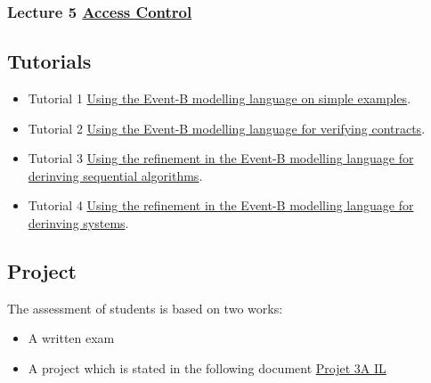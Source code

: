 \documentclass[ 12pt]{article}
\begin{document}
\subsubsection{ Lecture 5 
    \href{http://mery54.github.io/teaching/mosos/lecturesnotes/mcfsi-lect3.pdf}{Access 
      Control }
}



\subsection{Tutorials}

  \begin{itemize}
  \item[]   Tutorial 1
    \href{http://mery54.github.io/teaching/mosos/lecturesnotes/mcfsi-td1.pdf}{Using
      the Event-B modelling language on simple examples}.

   \item[]   Tutorial 2
    \href{http://mery54.github.io/teaching/mosos/lecturesnotes/mcfsi-td2.pdf}{Using
      the Event-B modelling language  for verifying contracts}.



    \item[]   Tutorial 3
    \href{http://mery54.github.io/teaching/mosos/lecturesnotes/mcfsi-td3.pdf}{Using
      the refinement in 
      the Event-B modelling language  for derinving sequential algorithms}.


    
    \item[]   Tutorial 4
    \href{http://mery54.github.io/teaching/mosos/lecturesnotes/mcfsi-td4.pdf}{Using
      the refinement in 
      the Event-B modelling language  for derinving  systems}.


  \end{itemize}

  
  \subsection{Project}
\label{sec:project}

The assessment  of students is based on two works:
\begin{itemize}
\item A written  exam
\item A project which is stated in the following document
  \href{http://mery54.github.io/teaching/mosos/lecturesnotes/telecom-projects2425.pdf}{Projet
    3A IL} 
\end{itemize}
\end{document}
